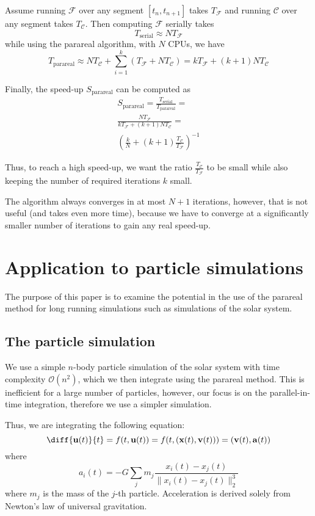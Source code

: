 \documentclass[conference]{IEEEtran}
\begin{document}
Assume running $\mathcal{F}$ over any segment $[t_n, t_{n+1}]$ takes $T_\mathcal{F}$ and running $\mathcal{C}$ over any segment takes $T_\mathcal{C}$. Then computing $\mathcal{F}$ serially takes
$$
T_\text{serial} \approx NT_\mathcal{F}
$$
while using the parareal algorithm, with $N$ CPUs, we have
$$
T_\text{parareal} \approx NT_\mathcal{C} + \sum_{i=1}^{k}\left(T_\mathcal{F} + NT_\mathcal{C}\right) = kT_\mathcal{F} + (k+1)NT_\mathcal{C}
$$

Finally, the speed-up $S_\text{parareal}$ can be computed as
\begin{multline}
S_\text{parareal} = \frac{T_\text{serial}}{T_\text{parareal}} = \\\frac{NT_\mathcal{F}}{kT_\mathcal{F} + (k+1)NT_\mathcal{C}} = \\\left(\frac{k}{N} + (k+1)\frac{T_\mathcal{C}}{T_\mathcal{F}}\right)^{-1}
\end{multline}

Thus, to reach a high speed-up, we want the ratio $\frac{T_\mathcal{C}}{T_\mathcal{F}}$ to be small while also keeping the number of required iterations $k$ small. \cite{speedup}

The algorithm always converges in at most $N+1$ iterations, however, that is not useful (and takes even more time), because we have to converge at a significantly smaller number of iterations to gain any real speed-up. \cite{speedup}

\section{Application to particle simulations}
The purpose of this paper is to examine the potential in the use of the parareal method for long running simulations such as simulations of the solar system. 

\subsection{The particle simulation}
We use a simple $n$-body particle simulation of the solar system with time complexity $\mathcal{O}(n^2)$, which we then integrate using the parareal method. This is inefficient for a large number of particles, however, our focus is on the parallel-in-time integration, therefore we use a simpler simulation.

Thus, we are integrating the following equation:
$$
\diff{\mathbf{u}(t)}{t} = f(t, \mathbf{u}(t)) = f(t, (\mathbf{x}(t), \mathbf{v}(t))) = (\mathbf{v}(t), \mathbf{a}(t))
$$
where 
$$
a_i(t) = -G \sum_j m_j\frac{x_i(t)-x_j(t)}{\|x_i(t)-x_j(t)\|_2^3}
$$
where $m_j$ is the mass of the $j$-th particle. Acceleration is derived solely from Newton's law of universal gravitation.
\end{document}
